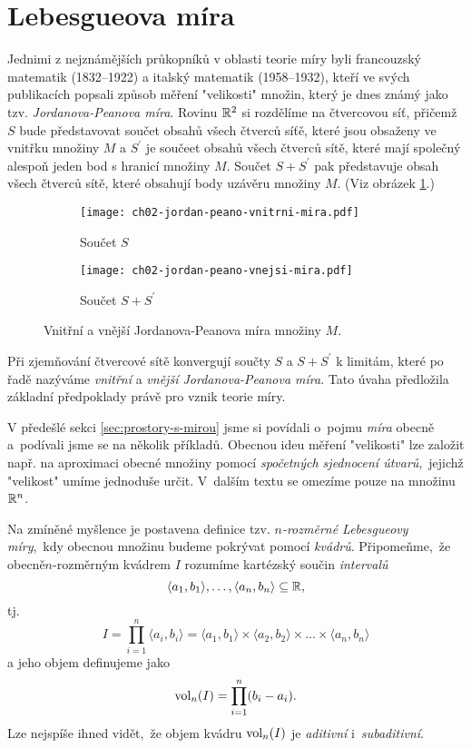 \section{Lebesgueova míra}\label{sec:lebesgueova-mira}

Jednimi z nejznámějších průkopníků v oblasti teorie míry byli francouzský matematik  (1832--1922) a italský matematik  (1958--1932), kteří ve svých publikacích popsali způsob měření "velikosti" množin, který je dnes známý jako tzv. \emph{Jordanova-Peanova míra}. Rovinu $\mathbb{R}^2$ si rozdělíme na čtvercovou síť, přičemž $S$ bude představovat součet obsahů všech čtverců síťě, které jsou obsaženy ve vnitřku množiny $M$ a $S^\prime$ je součeet obsahů všech čtverců sítě, které mají společný alespoň jeden bod s hranicí množiny $M$. Součet $S+S^\prime$ pak představuje obsah všech čtverců sítě, které obsahují body uzávěru množiny $M$. (Viz obrázek \ref{fig:jordan-peano-mira}.)
\begin{figure}[h]
    \centering
    \begin{subfigure}{0.4\textwidth}
        \centering
        \texttt{[image: ch02-jordan-peano-vnitrni-mira.pdf]}
        \caption{Součet $S$}
    \end{subfigure}
    \qquad
    \begin{subfigure}{0.4\textwidth}
        \centering
        \texttt{[image: ch02-jordan-peano-vnejsi-mira.pdf]}
        \caption{Součet $S+S^\prime$}
    \end{subfigure}
    \caption{Vnitřní a vnější Jordanova-Peanova míra množiny $M$.}
    \label{fig:jordan-peano-mira}
\end{figure}
Při zjemňování čtvercové sítě konvergují součty $S$ a $S+S^\prime$ k limitám, které po řadě nazýváme \emph{vnitřní} a \emph{vnější Jordanova-Peanova míra}. Tato úvaha předložila základní předpoklady právě pro vznik teorie míry. \cite{Sarmanova1996}

V předešlé sekci \ref{sec:prostory-s-mirou} jsme si povídali o~pojmu \emph{míra} obecně a~podívali jsme se na několik příkladů. Obecnou ideu měření "velikosti" lze založit např. na aproximaci obecné množiny pomocí \emph{spočetných sjednocení útvarů},~jejichž "velikost" umíme jednoduše určit. V~dalším textu se omezíme pouze na množinu $\mathbb{R}^n$.

Na zmíněné myšlence je postavena definice tzv. \emph{$n$-rozměrné Lebesgueovy míry},~kdy obecnou množinu budeme pokrývat pomocí \emph{kvádrů}. Připomeňme,~že obecně\linebreak\mbox{$n$-rozměrným} kvádrem $I$ rozumíme kartézský součin \emph{intervalů}
\[\langle a_1,b_1\rangle,\ldots,\langle a_n,b_n\rangle\subseteq\mathbb{R},\]
tj.
\[I=\prod_{i=1}^{n}\langle a_i,b_i\rangle=\langle a_1,b_1\rangle\times\langle a_2,b_2\rangle\times\dots\times\langle a_n,b_n\rangle\]
a jeho objem definujeme jako
\[\operatorname{vol}_n(I)=\prod_{i=1}^{n}(b_i-a_i).\]
Lze nejspíše ihned vidět,~že objem kvádru $\operatorname{vol}_n(I)$ je \emph{aditivní} i~\textit{subaditivní}.

